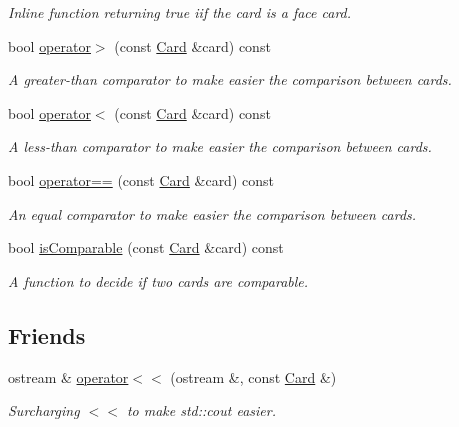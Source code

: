 \begin{DoxyCompactItemize}
\begin{DoxyCompactList}\small\item\em Inline function returning true iif the card is a face card. \end{DoxyCompactList}\item 
bool \hyperlink{classCard_a50bd8a1a5d5bdfce5727718844f87ce8}{operator$>$} (const \hyperlink{classCard}{Card} \&card) const 
\begin{DoxyCompactList}\small\item\em A greater-\/than comparator to make easier the comparison between cards. \end{DoxyCompactList}\item 
bool \hyperlink{classCard_a0210e809d9ec749824716ec1f5ebbf8a}{operator$<$} (const \hyperlink{classCard}{Card} \&card) const 
\begin{DoxyCompactList}\small\item\em A less-\/than comparator to make easier the comparison between cards. \end{DoxyCompactList}\item 
bool \hyperlink{classCard_a54a1553ca40e32768ee09465447b8090}{operator==} (const \hyperlink{classCard}{Card} \&card) const 
\begin{DoxyCompactList}\small\item\em An equal comparator to make easier the comparison between cards. \end{DoxyCompactList}\item 
bool \hyperlink{classCard_a2c531d32de5e76e758254b9d03689ae5}{is\-Comparable} (const \hyperlink{classCard}{Card} \&card) const 
\begin{DoxyCompactList}\small\item\em A function to decide if two cards are comparable. \end{DoxyCompactList}\end{DoxyCompactItemize}
\subsection*{Friends}
\begin{DoxyCompactItemize}
\item 
\hypertarget{classCard_a19eb35e24a8f6368e34575698fca9008}{ostream \& \hyperlink{classCard_a19eb35e24a8f6368e34575698fca9008}{operator$<$$<$} (ostream \&, const \hyperlink{classCard}{Card} \&)}\label{classCard_a19eb35e24a8f6368e34575698fca9008}

\begin{DoxyCompactList}\small\item\em Surcharging $<$$<$ to make std\-::cout easier. \end{DoxyCompactList}\end{DoxyCompactItemize}


